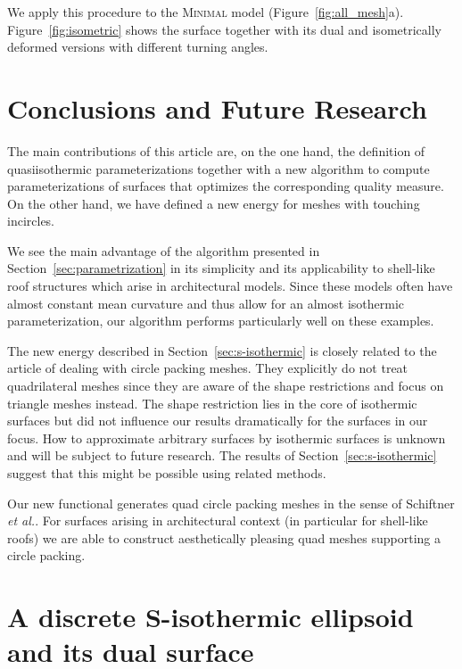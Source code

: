 \documentclass[Thesis.tex]{subfiles}
\begin{document}
We apply this procedure to the \textsc{Minimal} model
\mbox{(Figure~\ref{fig:all_mesh}a)}. Figure~\ref{fig:isometric} shows the
surface together
with its dual and isometrically deformed versions with different turning angles.


\section{Conclusions and Future Research}
\label{sec:future}
The main contributions of this article are, on the one hand, the definition of 
quasiisothermic parameterizations together with a new algorithm to
compute parameterizations of surfaces that optimizes the corresponding quality measure.
On the other hand, we have defined a new energy for meshes with touching incircles.

We see the main advantage of the algorithm presented in
Section~\ref{sec:parametrization} in its simplicity and its applicability to
shell-like roof structures which arise in architectural models. Since these
models often have almost constant mean curvature and thus allow for an almost
isothermic parameterization, our algorithm performs particularly well on these
examples.

The new energy described in Section~\ref{sec:s-isothermic} is closely related
to the article of \cite{Schiftner2009} dealing with
circle packing meshes. They explicitly do not treat quadrilateral meshes since
they are aware of the shape restrictions and focus on triangle meshes instead.
The shape restriction lies in the core of isothermic surfaces but
did not influence our results dramatically for the surfaces in our focus. How
to approximate arbitrary surfaces by isothermic surfaces is unknown and will be
subject to future research. The results of Section~\ref{sec:s-isothermic}
suggest that this might be possible using related methods.

Our new functional generates quad circle packing meshes in the sense of
Schiftner \emph{et al.}. For surfaces arising in architectural context (in
particular for shell-like roofs) we are able to construct aesthetically
pleasing quad meshes supporting a circle packing. 

\section{A discrete S-isothermic ellipsoid and its dual surface}
\end{document}
